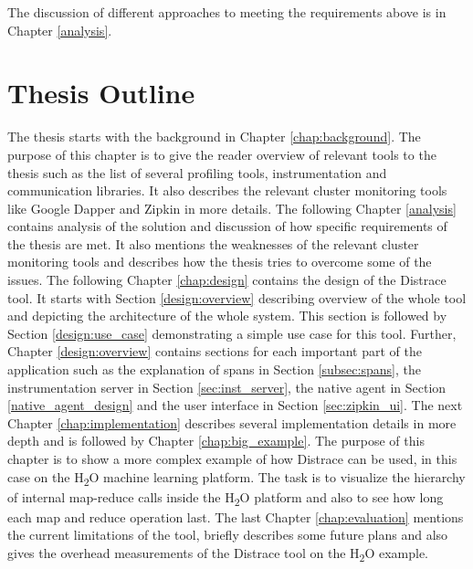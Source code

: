 The discussion of different approaches to meeting the requirements above is in Chapter \ref{analysis}.

\section{Thesis Outline}
The thesis starts with the background in Chapter \ref{chap:background}. The purpose of this chapter is to give the reader overview of relevant tools to the thesis such as the list of several profiling tools, instrumentation and communication libraries. It also describes the relevant cluster monitoring tools like Google Dapper and Zipkin in more details. The following Chapter \ref{analysis} contains analysis of the solution and discussion of how specific requirements of the thesis are met. It also mentions the weaknesses of the relevant cluster monitoring tools and describes how the thesis tries to overcome some of the issues. The following Chapter \ref{chap:design} contains the design of the Distrace tool. It starts with Section \ref{design:overview} describing overview of the whole tool and depicting the architecture of the whole system. This section is followed by Section \ref{design:use_case} demonstrating a simple use case for this tool. Further, Chapter \ref{design:overview} contains sections for each important part of the application such as the explanation of spans in Section \ref{subsec:spans}, the instrumentation server in Section \ref{sec:inst_server}, the native agent in Section \ref{native_agent_design} and the user interface in Section \ref{sec:zipkin_ui}. The next Chapter \ref{chap:implementation} describes several implementation details in more depth and is followed by Chapter \ref{chap:big_example}. The purpose of this chapter is to show a more complex example of how Distrace can be used, in this case on the H\textsubscript{2}O machine learning platform. The task is to visualize the hierarchy of internal map-reduce calls inside the H\textsubscript{2}O platform and also to see how long each map and reduce operation last. The last Chapter \ref{chap:evaluation} mentions the current limitations of the tool, briefly describes some future plans and also gives the overhead measurements of the Distrace tool on the H\textsubscript{2}O example. 
